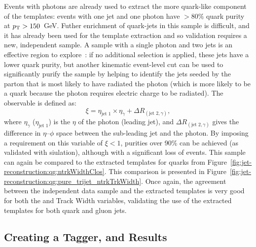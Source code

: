 Events with photons are already used to extract the more quark-like component of the templates: events with one jet and one photon have $>80\%$ quark purity at $p_{\text{T}} > 150$~GeV. Futher enrichment of quark-jets in this sample is difficult, and it has already been used for the template extraction and so validation requires a new, independent sample. A sample with a single photon and two jets is an effective region to explore~\cite{schwartz2}: if no additional selection is applied, these jets have a lower quark purity, but another kinematic event-level cut can be used to significantly purify the sample by helping to identify the jets seeded by the parton that is most likely to have radiated the photon (which is more likely to be a quark because the photon requires electric charge to be radiated). The observable is defined as:
%
\begin{equation}
\xi=\eta_\text{jet~1}\times\eta_\gamma+\Delta R_{(\text{jet~2},\gamma)},
\end{equation}
%
where $\eta_\gamma$ ($\eta_\text{jet~1}$) is the $\eta$ of the photon (leading jet), and 
$\Delta R_{(\text{jet~2},\gamma)}$ gives the difference in $\eta$--$\phi$ space between the sub-leading 
jet and the photon. By imposing a requirement on this variable of $\xi < 1$, purities over 90\% can be achieved (as validated with \Madgraph siulation), although with a significant loss of events. This sample can again be compared to the extracted templates for quarks from Figure~\ref{fig:jet-reconstruction:qg:ntrkWidthClos}. This comparison is presented in Figure~\ref{fig:jet-reconstruction:qg:pure_trijet_ntrkTrkWidth}. Once again, the agreement between the independent data sample and the extracted templates is very good for both the \ntrk and Track Width variables, validating the use of the extracted templates for both quark and gluon jets.

\subsection{Creating a Tagger, and Results}

\label{qg:tagger}

